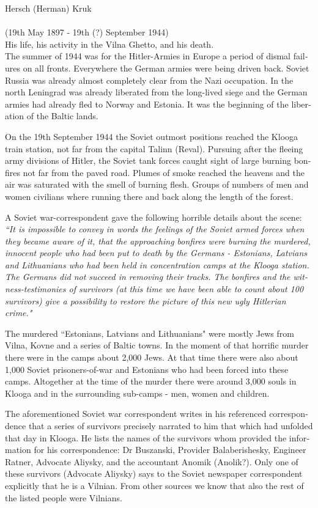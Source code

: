 \documentclass{article}
\begin{document}
\begin{pairs}
\begin{Leftside}
\begin{english}
Hersch (Herman) Kruk \\ \\ (19th May 1897 - 19th (?) September 1944) \\ 

His life, his activity in the Vilna Ghetto, and his death. \\

The summer of 1944 was for the Hitler-Armies in Europe a period
of dismal failures on all fronts. Everywhere the German armies 
were being driven back. Soviet Russia was already almost completely
clear from the Nazi occupation. In the north Leningrad was already
liberated from the long-lived siege and the German armies had already
fled to Norway and Estonia. It was the beginning of the liberation of the Baltic
lands.

On the 19th September 1944 the Soviet outmost positions reached the Klooga train station,
not far from the capital Talinn (Reval). Pursuing after the fleeing army divisions of Hitler, the
Soviet tank forces caught sight of large burning bonfires not far from the paved road.  Plumes
of smoke reached the heavens and the air was saturated with the smell of burning flesh. Groups of numbers of
men and women civilians where running there and back along the length of the forest.

A Soviet war-correspondent gave the following horrible details about the scene:
\emph{``It is impossible to convey in words the feelings of the Soviet armed forces when they
became aware of it, that the approaching bonfires were burning the murdered, innocent people who
had been put to death by the Germans - Estonians, Latvians and Lithuanians who had been held in
concentration camps at the Klooga station. The Germans did not succeed in removing their tracks.
The bonfires and the witness-testimonies of survivors 
(at this time we have been able to count about 100 survivors) give a possibility to restore the picture
of this new ugly Hitlerian crime."}

The murdered ``Estonians, Latvians and Lithuanians" were mostly Jews from Vilna, Kovne and a series
of Baltic towns. In the moment of that horrific murder there were in the camps about 2,000 Jews.
At that time there were also about 1,000 Soviet prisoners-of-war and Estonians who had been forced
into these camps. Altogether at the time of the murder there were around 3,000 souls in Klooga and in the 
surrounding sub-camps - men, women and children.

The aforementioned Soviet war correspondent writes in his referenced correspondence that a 
series of survivors precisely narrated to him that which had unfolded that day in Klooga. He lists the names
of the survivors whom provided the information for his correspondence: Dr Buszanski, Provider Balaberishesky,
Engineer Ratner, Advocate Aliysky, and the accountant Anomik (Anolik?). Only one of these survivors (Advocate
Aliysky) says to the Soviet newspaper correspondent explicitly that he is a Vilnian. From other sources we know
that also the rest of the listed people were Vilnians.


\end{english}
\end{Leftside}
\end{pairs}
\end{document}
